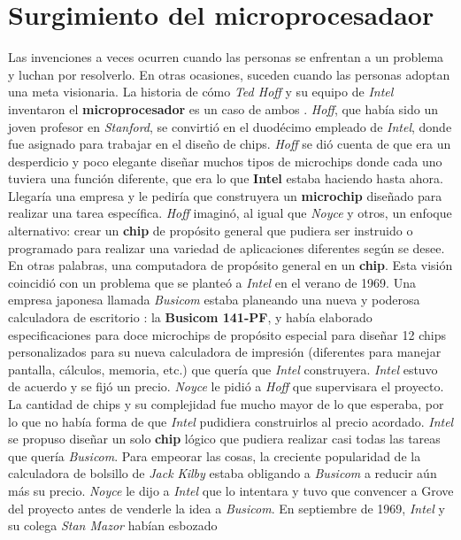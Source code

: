 \section{Surgimiento del microprocesadaor}
Las invenciones a veces ocurren cuando las personas se enfrentan a un problema y luchan por resolverlo. En otras ocasiones, suceden 
cuando las personas adoptan una meta visionaria. La historia de cómo \emph{Ted Hoff} y su equipo de \emph{Intel} inventaron el \textbf
{microprocesador} es un caso de ambos . \emph{Hoff}, que había sido un joven profesor en \emph{Stanford}, se
convirtió en el duodécimo empleado de \emph{Intel}, donde fue asignado para trabajar en el diseño de chips. \emph{Hoff} se dió cuenta de que era un
desperdicio y poco elegante diseñar muchos tipos de microchips donde cada uno tuviera una función diferente,  que era lo que \textbf
{Intel} estaba haciendo hasta ahora. Llegaría una empresa y le pediría que construyera un \textbf{microchip} diseñado para realizar una tarea
específica. \emph{Hoff} imaginó, al igual que \emph{Noyce} y otros, un enfoque alternativo: crear un \textbf{chip} de propósito general que pudiera
ser instruido o programado para realizar una variedad de aplicaciones diferentes según se desee. En otras palabras, una computadora de propósito
general en un \textbf{chip}. Esta visión coincidió con un problema que se planteó a \emph{Intel} en el verano de 1969. Una empresa japonesa llamada \emph
{Busicom} estaba planeando una nueva y poderosa calculadora de escritorio : la \textbf{Busicom 141-PF}, y había elaborado especificaciones para
doce microchips de propósito especial para diseñar 12 chips personalizados para su nueva calculadora de impresión (diferentes para
manejar pantalla, cálculos, memoria, etc.) que quería que \emph{Intel} construyera. \emph{Intel} estuvo de acuerdo y se fijó un precio. \emph{Noyce} le
pidió a \emph{Hoff} que supervisara el proyecto. La cantidad de chips y su complejidad fue mucho mayor de lo que esperaba, por lo que no
había forma de que \emph{Intel} pudidiera construirlos al precio acordado. \emph{Intel} se propuso diseñar un solo \textbf{chip} lógico
que pudiera realizar casi todas las tareas que quería \emph{Busicom}. Para empeorar las cosas,  la creciente popularidad de la calculadora
de bolsillo de \emph{Jack Kilby} estaba obligando a \emph{Busicom} a reducir aún más su precio. \emph{Noyce} le dijo a \emph{Intel} que lo intentara y  tuvo que
convencer a Grove del proyecto antes de venderle la idea a \emph{Busicom}. En septiembre de 1969, \emph{Intel} y su colega \emph{Stan Mazor} habían esbozado
